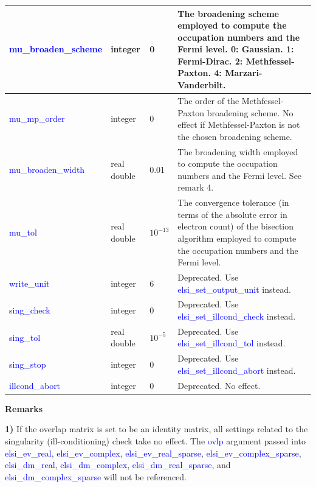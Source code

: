 \documentclass{report}
\begin{document}
\begin{tabular}[]{|p{30mm}|p{20mm}|p{15mm}|p{100mm}|}
\hline
\textcolor{blue}{mu\_broaden\_scheme} & integer            & 0          & The broadening scheme employed to compute the occupation numbers and the Fermi level.  0:  Gaussian.  1:  Fermi-Dirac.  2:  Methfessel-Paxton.  4:  Marzari-Vanderbilt.\\
\hline
\textcolor{blue}{mu\_mp\_order}       & integer            & 0          & The order of the Methfessel-Paxton broadening scheme.  No effect if Methfessel-Paxton is not the chosen broadening scheme.\\
\hline
\textcolor{blue}{mu\_broaden\_width}  & real double        & 0.01       & The broadening width employed to compute the occupation numbers and the Fermi level.  See remark 4.\\
\hline
\textcolor{blue}{mu\_tol}             & real double        & $10^{-13}$ & The convergence tolerance (in terms of the absolute error in electron count) of the bisection algorithm employed to compute the occupation numbers and the Fermi level.\\
\hline
\textcolor{blue}{write\_unit}         & integer            & 6          & Deprecated.  Use \textcolor{blue}{elsi\_set\_output\_unit} instead.\\
\hline
\textcolor{blue}{sing\_check}         & integer            & 0          & Deprecated.  Use \textcolor{blue}{elsi\_set\_illcond\_check} instead.\\
\hline
\textcolor{blue}{sing\_tol}           & real double        & $10^{-5}$  & Deprecated.  Use \textcolor{blue}{elsi\_set\_illcond\_tol} instead.\\
\hline
\textcolor{blue}{sing\_stop}          & integer            & 0          & Deprecated.  Use \textcolor{blue}{elsi\_set\_illcond\_abort} instead.\\
\hline
\textcolor{blue}{illcond\_abort}      & integer            & 0          & Deprecated.  No effect.\\
\hline
\end{tabular}

\textbf{Remarks}

\textbf{1)} If the overlap matrix is set to be an identity matrix, all settings related to the singularity (ill-conditioning) check take no effect.  The \textcolor{blue}{ovlp} argument passed into \textcolor{blue}{elsi\_ev\_real}, \textcolor{blue}{elsi\_ev\_complex}, \textcolor{blue}{elsi\_ev\_real\_sparse}, \textcolor{blue}{elsi\_ev\_complex\_sparse}, \textcolor{blue}{elsi\_dm\_real}, \textcolor{blue}{elsi\_dm\_complex}, \textcolor{blue}{elsi\_dm\_real\_sparse}, and \textcolor{blue}{elsi\_dm\_complex\_sparse} will not be referenced.
\end{document}

